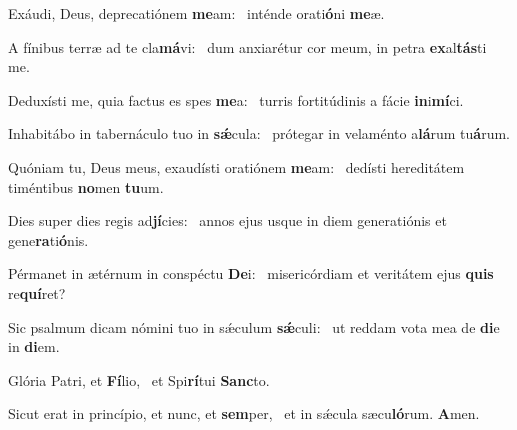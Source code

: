 \item Exáudi, Deus, deprecatiónem \textbf{me}am:~\psstar{} inténde orati\textbf{ó}ni \textbf{me}æ.
\item A fínibus terræ ad te cla\textbf{má}vi:~\psstar{} dum anxiarétur cor meum, in petra \textbf{ex}al\textbf{tás}ti me.
\item Deduxísti me, quia factus es spes \textbf{me}a:~\psstar{} turris fortitúdinis a fácie \textbf{in}i\textbf{mí}ci.
\item Inhabitábo in tabernáculo tuo in \textbf{sǽ}cula:~\psstar{} prótegar in velaménto a\textbf{lá}rum tu\textbf{á}rum.
\item Quóniam tu, Deus meus, exaudísti oratiónem \textbf{me}am:~\psstar{} dedísti hereditátem timéntibus \textbf{no}men \textbf{tu}um.
\item Dies super dies regis ad\textbf{jí}cies:~\psstar{} annos ejus usque in diem generatiónis et gene\textbf{ra}ti\textbf{ó}nis.
\item Pérmanet in ætérnum in conspéctu \textbf{De}i:~\psstar{} misericórdiam et veritátem ejus \textbf{quis} re\textbf{quí}ret?
\item Sic psalmum dicam nómini tuo in sǽculum \textbf{sǽ}culi:~\psstar{} ut reddam vota mea de \textbf{di}e in \textbf{di}em.
\item Glória Patri, et \textbf{Fí}lio,~\psstar{} et Spi\textbf{rí}tui \textbf{Sanc}to.
\item Sicut erat in princípio, et nunc, et \textbf{sem}per,~\psstar{} et in sǽcula sæcu\textbf{ló}rum. \textbf{A}men.
